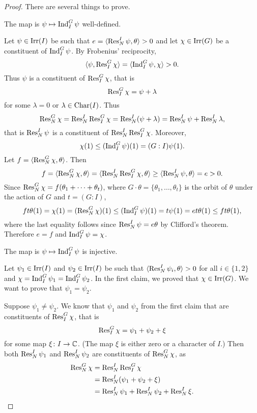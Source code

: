 \begin{proof}
    There are several things to prove. 

    \begin{claim}
        The map is $\psi\mapsto\operatorname{Ind}_I^G\psi$ well-defined. 
    \end{claim}

    Let $\psi\in\operatorname{Irr}(I)$ be such that $e=\langle\operatorname{Res}_N^I\psi,\theta\rangle>0$ and 
    let $\chi\in\operatorname{Irr}(G)$ be a constituent of $\operatorname{Ind}_I^G\psi$. By Frobenius' reciprocity, 
    \[
    \langle\psi,\operatorname{Res}_I^G\chi\rangle=\langle\operatorname{Ind}_I^G\psi,\chi\rangle>0.
    \]
    Thus $\psi$ is a constituent of $\operatorname{Res}_I^G\chi$, that is 
    \[
    \operatorname{Res}_I^G\chi=\psi+\lambda 
    \]
    for some $\lambda=0$ or $\lambda\in\operatorname{Char}(I)$. Thus
    \[
    \operatorname{Res}_N^G\chi=\operatorname{Res}_N^I\operatorname{Res}_I^G\chi=\operatorname{Res}_N^I(\psi+\lambda)
    =\operatorname{Res}_N^I\psi+\operatorname{Res}_N^I\lambda, 
    \]
    that is 
    $\operatorname{Res}_N^I\psi$ is a constituent of $\operatorname{Res}_N^I\operatorname{Res}_I^G\chi$. 
    Moreover, 
    \[
    \chi(1)\leq(\operatorname{Ind}_I^G\psi)(1)=(G:I)\psi(1).
    \]
    Let $f=\langle\operatorname{Res}_N^G\chi,\theta\rangle$. Then  
    \[
    f=\langle\operatorname{Res}_N^G\chi,\theta\rangle=\langle\operatorname{Res}_N^I\operatorname{Res}_I^G\chi,\theta\rangle
    \geq\langle\operatorname{Res}_N^I\psi,\theta\rangle=e>0.
    \]
    Since $\operatorname{Res}_N^G\chi=f(\theta_1+\cdots+\theta_t)$, where $G\cdot\theta=\{\theta_1,\dots,\theta_t\}$ is 
    the orbit of $\theta$ under the action of $G$ and $t=(G:I)$,  
    \[
    ft\theta(1)=\chi(1)=(\operatorname{Res}_N^G\chi)(1)\leq(\operatorname{Ind}_I^G\psi)(1)=t\psi(1)=et\theta(1)\leq ft\theta(1),
    \]
    where the last equality follows since 
    $\operatorname{Res}_N^I\psi=e\theta$ by Clifford's theorem. Therefore $e=f$ and 
    $\operatorname{Ind}_I^G\psi=\chi$. 

    \begin{claim}
        The map is $\psi\mapsto\operatorname{Ind}_I^G\psi$ is injective. 
    \end{claim}

    Let $\psi_1\in\operatorname{Irr}(I)$ and $\psi_2\in\operatorname{Irr}(I)$ 
    be such that 
    $\langle\operatorname{Res}_N^I\psi_i,\theta\rangle>0$ for all $i\in\{1,2\}$ and 
    $\chi=\operatorname{Ind}_I^G\psi_1=\operatorname{Ind}_I^G\psi_2$. In the first claim, we proved that $\chi\in\operatorname{Irr}(G)$. 
    We want to prove that $\psi_1=\psi_2$. 
    
    Suppose $\psi_1\ne\psi_2$. 
    We know that $\psi_1$ and $\psi_2$ from the first claim that
    are constituents
    of $\operatorname{Res}_I^G\chi$, that is 
    \[
    \operatorname{Res}_I^G\chi=\psi_1+\psi_2+\xi 
    \]
    for some map $\xi\colon I\to\mathbb{C}$. (The map $\xi$ is either zero
    or a character of $I$.) 
    Then both $\operatorname{Res}_N^I\psi_1$ and 
    $\operatorname{Res}_N^I\psi_2$ are constituents 
    of 
    $\operatorname{Res}_N^G\chi$, as  
    \begin{align*}
        \operatorname{Res}_N^G\chi&=\operatorname{Res}_N^I\operatorname{Res}_I^G\chi\\
        &=\operatorname{Res}_N^I(\psi_1+\psi_2+\xi)\\
        &=\operatorname{Res}_N^I\psi_1+\operatorname{Res}_N^I\psi_2+\operatorname{Res}_N^I\xi.       
    \end{align*}


\end{proof}
